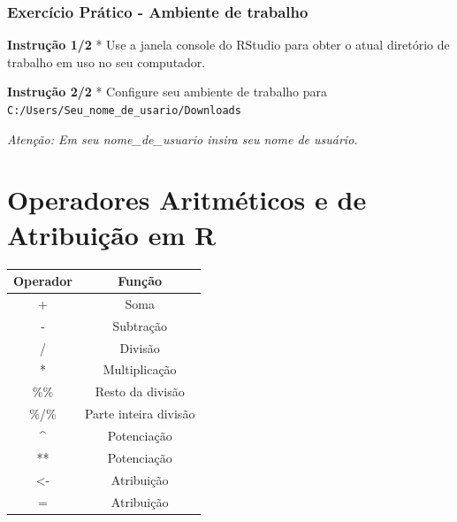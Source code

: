 \documentclass[
]{article}
\newenvironment{Shaded}{\begin{snugshade}}{\end{snugshade}}
\begin{document}
\begin{Shaded}
\begin{Highlighting}[]

\end{Highlighting}
\end{Shaded}

\hypertarget{exercuxedcio-pruxe1tico---ambiente-de-trabalho}{%
\subsubsection{Exercício Prático - Ambiente de
trabalho}\label{exercuxedcio-pruxe1tico---ambiente-de-trabalho}}

\textbf{Instrução 1/2} * Use a janela console do RStudio para obter o
atual diretório de trabalho em uso no seu computador.

\begin{Shaded}
\begin{Highlighting}[]

\end{Highlighting}
\end{Shaded}

\textbf{Instrução 2/2} * Configure seu ambiente de trabalho para
\texttt{\textquotesingle{}C:/Users/Seu\_nome\_de\_usario/Downloads\textquotesingle{}}

\emph{Atenção: Em seu nome\_de\_usuario insira seu nome de usuário.}

\begin{Shaded}
\begin{Highlighting}[]

\end{Highlighting}
\end{Shaded}

\begin{Shaded}
\begin{Highlighting}[]

\end{Highlighting}
\end{Shaded}

\hypertarget{operadores-aritmuxe9ticos-e-de-atribuiuxe7uxe3o-em-r}{%
\section{Operadores Aritméticos e de Atribuição em
R}\label{operadores-aritmuxe9ticos-e-de-atribuiuxe7uxe3o-em-r}}

\begin{longtable}[]{@{}cc@{}}
\toprule()
Operador & Função \\
\midrule()
\endhead
+ & Soma \\
- & Subtração \\
/ & Divisão \\
* & Multiplicação \\
\%\% & Resto da divisão \\
\%/\% & Parte inteira divisão \\
\^{} & Potenciação \\
** & Potenciação \\
\textless- & Atribuição \\
= & Atribuição \\
\bottomrule()
\end{longtable}
\end{document}
